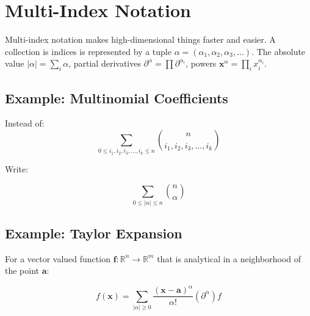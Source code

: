 \section{Multi-Index Notation}
Multi-index notation makes high-dimensional things faster and easier. A collection is indices is represented by a tuple $\alpha = \left(\alpha_1,\alpha_2,\alpha_3,... \right)$. The absolute value $|\alpha| = \sum_i \alpha$, partial derivatives $\partial^\alpha = \prod \partial^{\alpha_i}$, powers $\mathbf{x}^\alpha = \prod_i x_i^{\alpha_i}$.

\subsection{Example: Multinomial Coefficients}	

Instead of:
\begin{equation}
\sum_{0\leq i_1,i_2,i_3,...,i_k \leq n} {n \choose i_1,i_2,i_3,...,i_k} 
\end{equation}

Write:

\begin{equation}	
\sum_{0\leq |\alpha|\leq n}{n \choose \alpha}
\end{equation}

\subsection{Example: Taylor Expansion}

For a vector valued function $\mathbf{f}: \mathbb{R}^n \rightarrow \mathbb{R}^m$ that is analytical in a neighborhood of the point $\mathbf{a}$:

\begin{equation}
f(\mathbf{x}) = \sum_{|\alpha|\geq0} \frac{(\mathbf{x} - \mathbf{a})^\alpha}{\alpha!}(\partial^\alpha)f
\end{equation}
